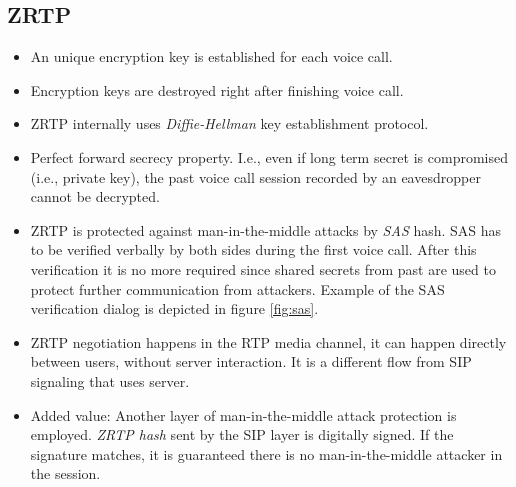 \documentclass[a4paper,10pt]{article}
\begin{document}
\subsection{ZRTP}
\begin{itemize}
 \item An unique encryption key is established for each voice call.
 \item Encryption keys are destroyed right after finishing voice call.
 \item ZRTP internally uses \emph{Diffie-Hellman} key establishment protocol.
 \item Perfect forward secrecy property. I.e., even if long term secret is compromised (i.e., private key), the past voice call session recorded by an eavesdropper cannot be decrypted.
 \item ZRTP is protected against man-in-the-middle attacks by \emph{SAS} hash. SAS has to be verified verbally by both sides during the first voice call. After this verification
it is no more required since shared secrets from past are used to protect further communication from attackers. Example of the SAS verification dialog is depicted in figure \ref{fig:sas}.
 \item ZRTP negotiation happens in the RTP media channel, it can happen directly between users, without server interaction. It is a different flow from SIP signaling that uses server.
 \item Added value: Another layer of man-in-the-middle attack protection is employed. \emph{ZRTP hash} sent by the SIP layer is digitally signed. If the signature matches, it is guaranteed there
is no man-in-the-middle attacker in the session.
\end{itemize}
\end{document}

